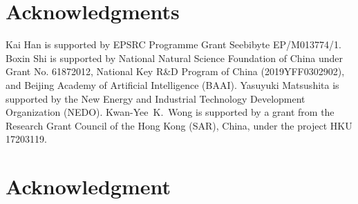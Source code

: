 \documentclass[10pt,journal,compsoc]{IEEEtran}
\begin{document}
\ifCLASSOPTIONcompsoc

\section*{Acknowledgments}
Kai Han is supported by EPSRC Programme Grant Seebibyte EP/M013774/1.
Boxin Shi is supported by National Natural Science Foundation of China under Grant No. 61872012, National Key R\&D Program of China (2019YFF0302902), and Beijing Academy of Artificial Intelligence (BAAI).
Yasuyuki Matsushita is supported by the New Energy and Industrial Technology Development Organization (NEDO).
Kwan-Yee~K.~Wong is supported by a grant from the Research Grant Council of the Hong Kong (SAR), China, under the project HKU 17203119.
\else
  \section*{Acknowledgment}
\fi

\ifCLASSOPTIONcaptionsoff
  \newpage
\fi







\end{document}
